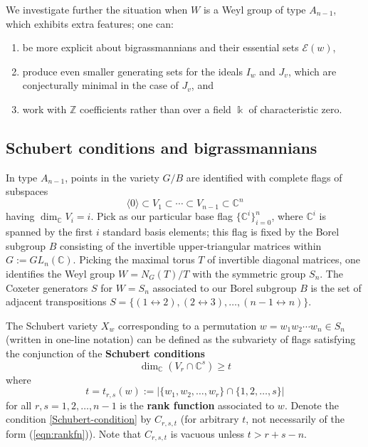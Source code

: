 \documentclass[12pt,dvips]{amsart}
\theoremstyle{plain}
\theoremstyle{definition}
\theoremstyle{remark}
\numberwithin{equation}{section}
\def\ZZ{{\mathbb Z}}
\def\CC{{\mathbb C}}
\def\Ess{{\mathcal{E}}}
\begin{document}
We investigate further the situation when $W$ is a Weyl group of 
type $A_{n-1}$, which exhibits extra features; one can: 
\begin{enumerate}
\item[$\bullet$] be more explicit about bigrassmannians and their essential sets $\Ess(w)$,
\item[$\bullet$] produce even smaller generating sets for the ideals
$I_w$ and $J_v$, which are conjecturally minimal in the case of $J_v$, and
\item[$\bullet$] work with $\ZZ$ coefficients rather than
over a field $\Bbbk$ of characteristic zero.
\end{enumerate}


\subsection{Schubert conditions and bigrassmannians}
\label{bigrassmannian-subsection}

  In type $A_{n-1}$, points in the variety $G/B$ 
are identified with complete flags of subspaces
$$
\langle 0\rangle \subset V_1 \subset \cdots \subset V_{n-1} \subset \CC^n
$$ having $\dim_\CC V_i = i$.  Pick as our particular base flag $\{
\CC^i \}_{i=0}^n$, where $\CC^i$ is spanned by the first $i$ standard
basis elements; this flag is fixed by the Borel subgroup $B$
consisting of the invertible upper-triangular matrices within
$G:=GL_n(\CC)$.  Picking the maximal torus $T$ of invertible diagonal
matrices, one identifies the Weyl group $W=N_G(T)/T$ with the
symmetric group $S_n$.  The Coxeter generators $S$ for $W=S_n$
associated to our Borel subgroup $B$ is the set of adjacent
transpositions $S=\{(1\leftrightarrow 2), (2\leftrightarrow
3),\ldots,(n-1 \leftrightarrow n)\}$.

  The Schubert variety $X_w$ corresponding to a
permutation $w=w_1 w_2 \cdots w_n\in S_n$ (written in one-line notation)
can be defined as the subvariety
of flags satisfying the conjunction of the {\bf Schubert conditions}
\begin{equation}
\label{Schubert-condition}
\dim_\CC (V_r \cap \CC^s) \geq t
\end{equation}
where 
\begin{equation}
\label{eqn:rankfn}
t={t}_{r,s}(w):=|\{w_1,w_2,\ldots,w_r\} \cap \{1,2,\ldots,s\}|
\end{equation}
for all $r,s=1,2,\ldots,n-1$ is the {\bf rank function} associated to $w$.  
Denote the condition \eqref{Schubert-condition}
by $C_{r,s,t}$ (for arbitrary $t$, not necessarily of the form (\ref{eqn:rankfn})).  
Note that $C_{r,s,t}$ is vacuous unless $t > r+s-n$.
\end{document}
